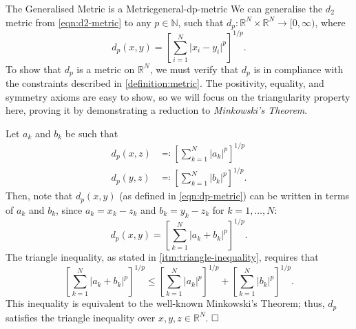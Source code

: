 \documentclass{article}
\renewcommand*\qedsymbol{\hfill\ensuremath{\Box}}
\numberwithin{equation}{section}
\numberwithin{enumi}{section}
\begin{document}
\begin{theorem}{The Generalised Metric is a Metric}{general-dp-metric}
    We can generalise the $d_2$ metric from \cref{eqn:d2-metric} to any $ p
    \in \mathbb{N} $, such that $ d_p \colon \mathbb{R}^N \times \mathbb{R}^N
    \to [0, \infty) $, where
    \begin{equation}
        d_p(x, y) = \left[\sum_{i=1}^N \vert x_i - y_i \vert^p\right]^{1/p}.
        \label{eqn:dp-metric}
    \end{equation}
    To show that $ d_p $ is a metric on $ \mathbb{R}^N $, we must verify that $
    d_p $ is in compliance with the constraints described in
    \cref{definition:metric}. The positivity, equality, and symmetry axioms are
    easy to show, so we will focus on the triangularity property here, proving
    it by demonstrating a reduction to \emph{Minkowski's Theorem}.

    Let $ a_k $ and $ b_k $ be such that
    \begin{align}
        d_p(x, z) &\eqcolon \left[\sum_{k=1}^N \vert a_k \vert^p\right]^{1/p} \\
        d_p(y, z) &\eqcolon \left[\sum_{k=1}^N \vert b_k \vert^p\right]^{1/p}.
    \end{align}
    Then, note that $ d_p(x, y) $ (as defined in \cref{eqn:dp-metric}) can be
    written in terms of $ a_k $ and $ b_k $, since $ a_k = x_k - z_k $ and $ b_k
    = y_k - z_k $ for $ k = 1, \ldots, N $:
    \begin{equation}
        d_p(x, y) = \left[\sum_{k=1}^N \vert a_k + b_k \vert^p\right]^{1/p}.
    \end{equation}
    The triangle inequality, as stated in \cref{itm:triangle-inequality},
    requires that
    \begin{equation}
        \left[\sum_{k=1}^N \vert a_k + b_k \vert^p\right]^{1/p} \leq
        \left[\sum_{k=1}^N \vert a_k \vert^p\right]^{1/p} +
        \left[\sum_{k=1}^N \vert b_k \vert^p\right]^{1/p}.
    \end{equation}
    This inequality is equivalent to the well-known Minkowski's Theorem; thus,
    $ d_p $ satisfies the triangle inequality over $ x, y, z \in \mathbb{R}^N $.
    $ \qedsymbol $
\end{theorem}
\end{document}
